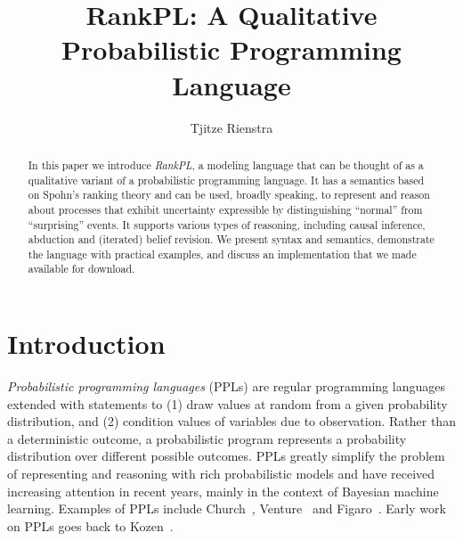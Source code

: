 \documentclass{llncs}
\begin{document}
\title{RankPL: A Qualitative Probabilistic Programming Language}

\author{Tjitze Rienstra}


\maketitle

\begin{abstract}
In this paper we introduce \emph{RankPL}, a modeling language
	that can be thought of as a qualitative variant of a probabilistic programming language.
It has a semantics based on Spohn's ranking theory and can be used,
	broadly speaking, to represent and reason about processes that exhibit 
	uncertainty expressible by distinguishing ``normal'' from ``surprising'' events.
It supports various types of reasoning, including causal inference, abduction and (iterated) belief revision.
We present syntax and semantics, 
	demonstrate the language with practical examples,
	and discuss an implementation that we made available for download.
\end{abstract}

\section{Introduction}

\emph{Probabilistic programming languages} (PPLs) are regular programming languages extended with statements to 
	(1) draw values at random from a given probability distribution, and 
	(2) condition values of variables due to observation.
Rather than a deterministic outcome, a probabilistic program represents a probability distribution over different possible outcomes.
PPLs greatly simplify the problem of representing and reasoning with rich probabilistic models 
	and have received increasing attention in recent years, mainly in the context of Bayesian machine learning.
Examples of PPLs include Church~\cite{DBLP:conf/uai/GoodmanMRBT08}, 
	Venture~\cite{DBLP:journals/corr/MansinghkaSP14} and Figaro~\cite{pfeffer2009figaro}.
Early work on PPLs goes back to Kozen~\cite{DBLP:journals/jcss/Kozen81}.
\end{document}
